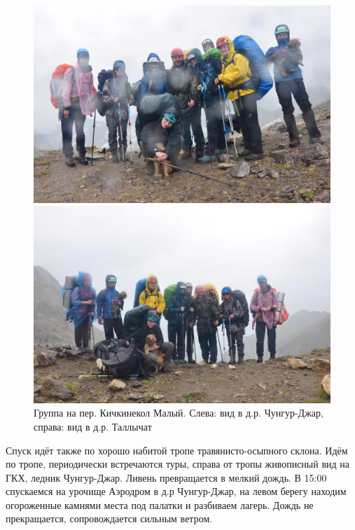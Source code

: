 \begin{figure}[h!]
	\centering
	\begin{minipage}[h]{0.48\linewidth}
		\includegraphics[width=0.99\linewidth]{../pics/DSC_0239.jpg}
	\end{minipage}
	\quad
	\begin{minipage}[h]{0.48\linewidth}
		\includegraphics[width=0.99\linewidth]{../pics/DSC_0242.jpg}
	\end{minipage}
	\caption{Группа на пер. Кичкинекол Малый. Слева: вид в д.р. Чунгур-Джар, справа: вид в д.р. Таллычат}
	\label{fig:DSC_0239}
\end{figure}

Спуск идёт также по хорошо набитой тропе травянисто-осыпного склона. Идём по тропе, периодически встречаются туры, справа от тропы живописный вид на ГКХ, ледник Чунгур-Джар. Ливень превращается в мелкий дождь. В 15:00 спускаемся на урочище Аэродром в д.р Чунгур-Джар, на левом берегу находим огороженные камнями места под палатки и разбиваем лагерь. Дождь не прекращается, сопровождается сильным ветром.

